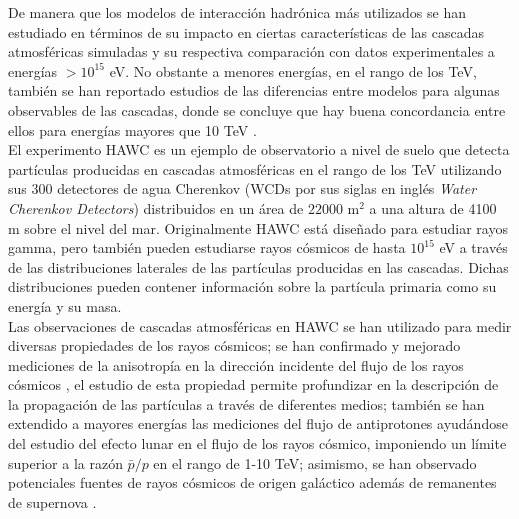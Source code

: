 De manera que los modelos de interacci\'on hadr\'onica m\'as utilizados se han estudiado en t\'erminos de su impacto en ciertas caracter\'isticas de las cascadas atmosf\'ericas simuladas y su respectiva comparaci\'on con datos experimentales a energ\'ias $>10^{15}$ eV. No obstante a menores energ\'ias, en el rango de los TeV, tambi\'en se han reportado estudios de las diferencias entre modelos para algunas observables de las cascadas, donde se concluye que hay buena concordancia entre ellos para energ\'ias mayores que 10 TeV \cite{Parsons2019}. \\

El experimento HAWC es un ejemplo de observatorio a nivel de suelo que detecta part\'iculas producidas en cascadas atmosf\'ericas en el rango de los TeV utilizando sus 300 detectores de agua Cherenkov (WCDs por sus siglas en ingl\'es \textit{Water Cherenkov Detectors}) distribuidos en un \'area de $22000$ m$^2$ a una altura de 4100 m sobre el nivel del mar. Originalmente HAWC est\'a dise\~nado para estudiar rayos gamma, pero tambi\'en pueden estudiarse rayos c\'osmicos de hasta $10^{15}$ eV a trav\'es de las distribuciones laterales de las part\'iculas producidas en las cascadas.  Dichas distribuciones pueden contener informaci\'on sobre la part\'icula primaria como su energ\'ia y su masa. \\

Las observaciones de cascadas atmosf\'ericas en HAWC se han utilizado para medir diversas propiedades de los rayos c\'osmicos; se han confirmado y mejorado mediciones de la anisotrop\'ia en la direcci\'on incidente del flujo de los rayos c\'osmicos \cite{Abeysekara2018a}, el estudio de esta propiedad permite profundizar en la descripci\'on de la propagaci\'on de las part\'iculas a trav\'es de diferentes medios; tambi\'en se han extendido a mayores energ\'ias las mediciones del flujo de antiprotones \cite{Abeysekara2018} ayud\'andose del estudio del efecto lunar en el flujo de los rayos c\'osmico, imponiendo un l\'imite superior a la raz\'on $\bar{p}/p$ en el rango de 1-10 TeV; asimismo, se han observado potenciales fuentes de rayos c\'osmicos de origen gal\'actico además de remanentes de supernova \cite{Hooper2017, Malone2019, Abeysekara2021}.
\singlespace


